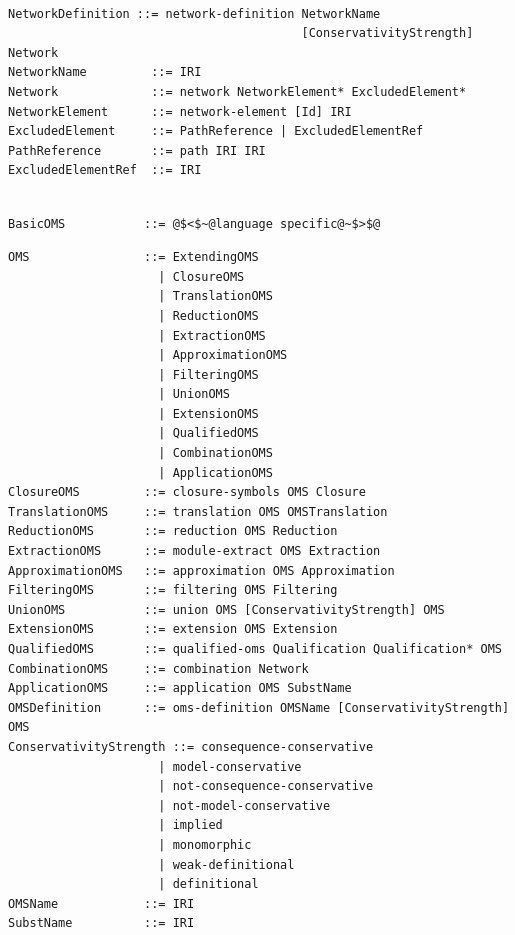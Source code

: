 \documentclass[10pt, a4paper]{isov2}
\begin{document}
\label{a:networks}
\begin{lstlisting}[language=ebnf,escapeinside={@@}]  % abstract syntax

NetworkDefinition ::= network-definition NetworkName
                                         [ConservativityStrength] Network
NetworkName         ::= IRI
Network             ::= network NetworkElement* ExcludedElement*
NetworkElement      ::= network-element [Id] IRI
ExcludedElement     ::= PathReference | ExcludedElementRef
PathReference       ::= path IRI IRI
ExcludedElementRef  ::= IRI
\end{lstlisting}




\begin{lstlisting}[language=ebnf,escapeinside={@@}]  % abstract syntax

BasicOMS           ::= @$<$~@language specific@~$>$@ 
\end{lstlisting}
\begin{lstlisting}[language=ebnf,escapeinside={@@}]  % abstract syntax
OMS                ::= ExtendingOMS
                     | ClosureOMS
                     | TranslationOMS
                     | ReductionOMS
                     | ExtractionOMS
                     | ApproximationOMS
                     | FilteringOMS
                     | UnionOMS
                     | ExtensionOMS
                     | QualifiedOMS
                     | CombinationOMS
                     | ApplicationOMS
ClosureOMS         ::= closure-symbols OMS Closure
TranslationOMS     ::= translation OMS OMSTranslation
ReductionOMS       ::= reduction OMS Reduction
ExtractionOMS      ::= module-extract OMS Extraction
ApproximationOMS   ::= approximation OMS Approximation
FilteringOMS       ::= filtering OMS Filtering
UnionOMS           ::= union OMS [ConservativityStrength] OMS
ExtensionOMS       ::= extension OMS Extension
QualifiedOMS       ::= qualified-oms Qualification Qualification* OMS
CombinationOMS     ::= combination Network
ApplicationOMS     ::= application OMS SubstName
OMSDefinition      ::= oms-definition OMSName [ConservativityStrength] OMS
ConservativityStrength ::= consequence-conservative
                     | model-conservative
                     | not-consequence-conservative
                     | not-model-conservative
                     | implied
                     | monomorphic
                     | weak-definitional
                     | definitional
OMSName            ::= IRI
SubstName          ::= IRI
\end{lstlisting}
\end{document}
